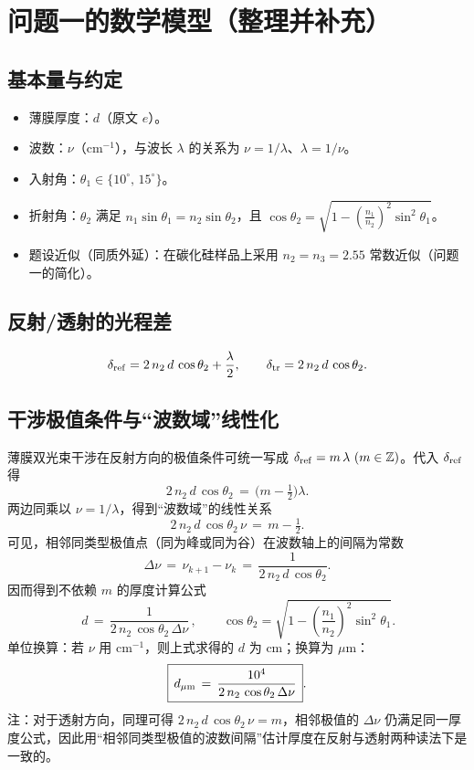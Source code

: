 \documentclass[withoutpreface,bwprint]{cumcmthesis} %
\begin{document}
\section{问题一的数学模型（整理并补充）}
\subsection{基本量与约定}
\begin{itemize}
    \item 薄膜厚度：\(d\)（原文 \(e\)）。
    \item 波数：\(\nu\)（cm\(^{-1}\)），与波长 \(\lambda\) 的关系为 \(\nu=1/\lambda\)、\(\lambda=1/\nu\)。
    \item 入射角：\(\theta_1\in\{10^\circ,\,15^\circ\}\)。
    \item 折射角：\(\theta_2\) 满足 \(n_1\sin\theta_1=n_2\sin\theta_2\)，且 \(\cos\theta_2=\sqrt{1-(\tfrac{n_1}{n_2})^2\sin^2\theta_1}\)。
    \item 题设近似（同质外延）：在碳化硅样品上采用 \(n_2=n_3=2.55\) 常数近似（问题一的简化）。
\end{itemize}
\subsection{反射/透射的光程差}
\[
    \delta_{\rm ref}=2\,n_2\,d\,\cos\theta_2+\frac{\lambda}{2},\qquad
    \delta_{\rm tr}=2\,n_2\,d\,\cos\theta_2.
\]
\subsection{干涉极值条件与“波数域”线性化}
薄膜双光束干涉在反射方向的极值条件可统一写成 \(\delta_{\rm ref}=m\,\lambda\ (m\in\mathbb{Z})\)。代入 \(\delta_{\rm ref}\) 得
\[
    2\,n_2\,d\,\cos\theta_2 \,=\, \Big(m-\tfrac{1}{2}\Big)\lambda.
\]
两边同乘以 \(\nu=1/\lambda\)，得到“波数域”的线性关系
\[
    2\,n_2\,d\,\cos\theta_2\,\nu \,=\, m-\tfrac{1}{2}.
\]
可见，相邻同类型极值点（同为峰或同为谷）在波数轴上的间隔为常数
\[
    \Delta \nu \,=\, \nu_{k+1}-\nu_k \,=\, \frac{1}{2\,n_2\,d\,\cos\theta_2}.
\]
因而得到不依赖 \(m\) 的厚度计算公式
\[
    \boxed{\,d \,=\, \frac{1}{2\,n_2\,\cos\theta_2\,\Delta \nu}\,},\qquad
    \cos\theta_2=\sqrt{1-\left(\frac{n_1}{n_2}\right)^2\sin^2\theta_1}.
\]
单位换算：若 \(\nu\) 用 cm\(^{-1}\)，则上式求得的 \(d\) 为 cm；换算为 \(\mu\)m：
\[
    \boxed{\,d_{\mu{\rm m}} \,=\, \frac{10^4}{2\,n_2\,\cos\theta_2\,\Delta \nu}\,}.
\]
注：对于透射方向，同理可得 \(2\,n_2\,d\,\cos\theta_2\,\nu=m\)，相邻极值的 \(\Delta\nu\) 仍满足同一厚度公式，因此用“相邻同类型极值的波数间隔”估计厚度在反射与透射两种读法下是一致的。
\end{document}
